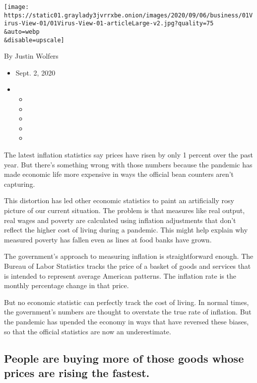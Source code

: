 \texttt{[image: https://static01.graylady3jvrrxbe.onion/images/2020/09/06/business/01Virus-View-01/01Virus-View-01-articleLarge-v2.jpg?quality=75\\\&auto=webp\\\&disable=upscale]}

By Justin Wolfers

\begin{itemize}
\item
  Sept. 2, 2020
\item
  \begin{itemize}
  \item
  \item
  \item
  \item
  \item
  \end{itemize}
\end{itemize}

The latest inflation statistics say prices have risen by only 1 percent
over the past year. But there's something wrong with those numbers
because the pandemic has made economic life more expensive in ways the
official bean counters aren't capturing.

This distortion has led other economic statistics to paint an
artificially rosy picture of our current situation. The problem is that
measures like real output, real wages and poverty are calculated using
inflation adjustments that don't reflect the higher cost of living
during a pandemic. This might help explain why measured poverty has
fallen even as lines at food banks have grown.

The government's approach to measuring inflation is straightforward
enough. The Bureau of Labor Statistics tracks the price of a basket of
goods and services that is intended to represent average American
patterns. The inflation rate is the monthly percentage change in that
price.

But no economic statistic can perfectly track the cost of living. In
normal times, the government's numbers are thought to overstate the true
rate of inflation. But the pandemic has upended the economy in ways that
have reversed these biases, so that the official statistics are now an
underestimate.

\hypertarget{people-are-buying-more-of-those-goods-whose-prices-are-rising-the-fastest}{%
\subsection{People are buying more of those goods whose prices are
rising the
fastest.}\label{people-are-buying-more-of-those-goods-whose-prices-are-rising-the-fastest}}

